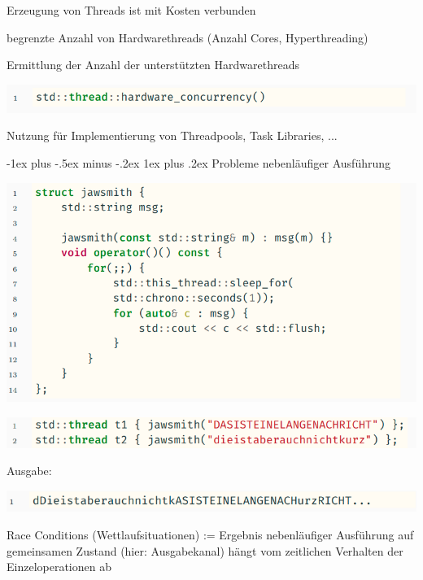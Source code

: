 \documentclass[10pt]{article}
\makeatletter
\renewcommand{\subsubsection}{\@startsection{subsubsection}{3}{0mm}%
                                {-1ex plus -.5ex minus -.2ex}%
                                {1ex plus .2ex}%
                                {\normalfont\small\bfseries}}
\makeatother
\begin{document}
  \begin{itemize*}
    \item Erzeugung von Threads ist mit Kosten verbunden
    \item begrenzte Anzahl von Hardwarethreads (Anzahl Cores, Hyperthreading)
    \item Ermittlung der Anzahl der unterstützten Hardwarethreads
  \end{itemize*}
  \begin{center}
    \includegraphics[width=0.7\linewidth]{Assets/Programmierparadigmen-code-snippet-20}
  \end{center}
  \begin{itemize*}
    \item Nutzung für Implementierung von Threadpools, Task Libraries, ...
  \end{itemize*}
  
  \subsubsection{Probleme nebenläufiger Ausführung}
  \begin{center}
    \includegraphics[width=0.7\linewidth]{Assets/Programmierparadigmen-code-snippet-21}
  \end{center}
  \begin{center}
    \includegraphics[width=0.7\linewidth]{Assets/Programmierparadigmen-code-snippet-22}
  \end{center}
  Ausgabe:
  \begin{center}
    \includegraphics[width=0.7\linewidth]{Assets/Programmierparadigmen-code-snippet-23}
  \end{center}
  \color{orange} Race Conditions \color{black}(Wettlaufsituationen) := Ergebnis nebenläufiger Ausführung auf gemeinsamen Zustand (hier: Ausgabekanal) hängt vom zeitlichen Verhalten der Einzeloperationen ab
  
\end{document}
